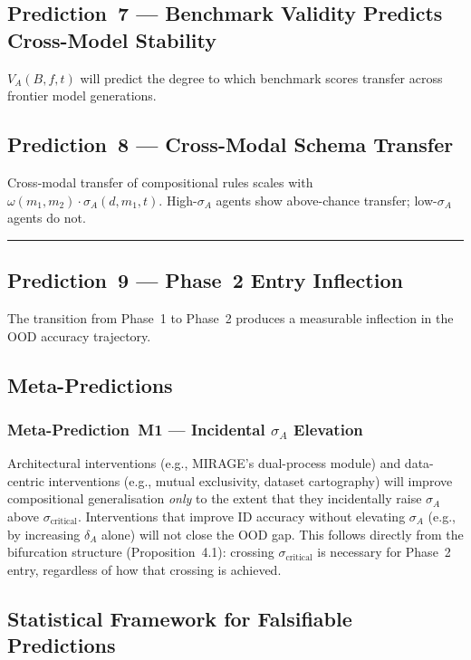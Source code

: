\documentclass[10pt]{article}
\begin{document}
\subsection{Prediction~7 --- Benchmark Validity Predicts Cross-Model
Stability}
$V_A(B,f,t)$ will predict the degree to which benchmark scores transfer
across frontier model generations.

\subsection{Prediction~8 --- Cross-Modal Schema Transfer}
Cross-modal transfer of compositional rules scales with
$\omega(m_1, m_2) \cdot \sigma_A(d, m_1, t)$. High-$\sigma_A$ agents
show above-chance transfer; low-$\sigma_A$ agents do not.

\noindent\rule{\linewidth}{0.4pt}

\subsection{Prediction~9 --- Phase~2 Entry Inflection}
The transition from Phase~1 to Phase~2 produces a measurable inflection
in the OOD accuracy trajectory.

\subsection*{Meta-Predictions}

\subsubsection*{Meta-Prediction~M1 --- Incidental \texorpdfstring{$\sigma_A$}{sigma\_A} Elevation}\label{sec:meta-M1}
Architectural interventions (e.g., MIRAGE's dual-process module) and
data-centric interventions (e.g., mutual exclusivity, dataset
cartography) will improve compositional generalisation \emph{only}
to the extent that they incidentally raise $\sigma_A$ above
$\sigma_{\text{critical}}$. Interventions that improve ID accuracy
without elevating $\sigma_A$ (e.g., by increasing $\delta_A$ alone)
will not close the OOD gap. This follows directly from the
bifurcation structure (Proposition~4.1): crossing
$\sigma_{\text{critical}}$ is necessary for Phase~2 entry, regardless
of how that crossing is achieved.

\subsection{Statistical Framework for Falsifiable Predictions}\label{sec:statistical-framework}
\end{document}
